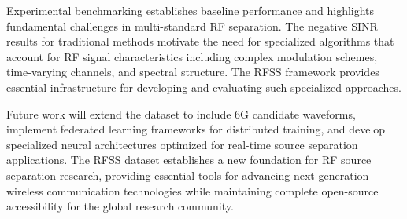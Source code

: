 \documentclass[twocolumn]{article}
\begin{document}
Experimental benchmarking establishes baseline performance and highlights fundamental challenges in multi-standard RF separation. The negative SINR results for traditional methods motivate the need for specialized algorithms that account for RF signal characteristics including complex modulation schemes, time-varying channels, and spectral structure. The RFSS framework provides essential infrastructure for developing and evaluating such specialized approaches.

Future work will extend the dataset to include 6G candidate waveforms, implement federated learning frameworks for distributed training, and develop specialized neural architectures optimized for real-time source separation applications. The RFSS dataset establishes a new foundation for RF source separation research, providing essential tools for advancing next-generation wireless communication technologies while maintaining complete open-source accessibility for the global research community.



\end{document}
